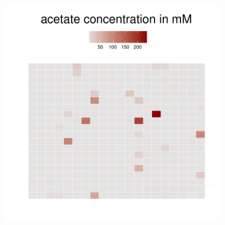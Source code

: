 \begin{figure}[h!]
{\begin{minipage}[t]{0.3\textwidth}
  \end{minipage}
  \begin{minipage}[t]{0.3\textwidth}
    \includegraphics[width=\textwidth]{../results/barkeri_ecoli_20x20_seed4612_ace150.pdf}
  \end{minipage}
  }
\end{figure}
